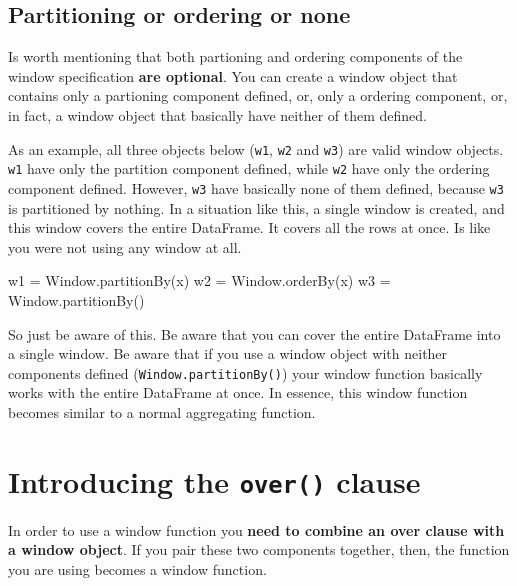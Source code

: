 \documentclass[
  11pt,
  letterpaper,
  DIV=11,
  numbers=noendperiod]{scrreprt}
\newenvironment{Shaded}{\begin{snugshade}}{\end{snugshade}}
\newcommand{\NormalTok}[1]{\textcolor[rgb]{0.00,0.23,0.31}{#1}}
\newcommand{\OperatorTok}[1]{\textcolor[rgb]{0.37,0.37,0.37}{#1}}
\newcommand{\StringTok}[1]{\textcolor[rgb]{0.13,0.47,0.30}{#1}}
\begin{document}
\hypertarget{partitioning-or-ordering-or-none}{%
\subsection{Partitioning or ordering or
none}\label{partitioning-or-ordering-or-none}}

Is worth mentioning that both partioning and ordering components of the
window specification \textbf{are optional}. You can create a window
object that contains only a partioning component defined, or, only a
ordering component, or, in fact, a window object that basically have
neither of them defined.

As an example, all three objects below (\texttt{w1}, \texttt{w2} and
\texttt{w3}) are valid window objects. \texttt{w1} have only the
partition component defined, while \texttt{w2} have only the ordering
component defined. However, \texttt{w3} have basically none of them
defined, because \texttt{w3} is partitioned by nothing. In a situation
like this, a single window is created, and this window covers the entire
DataFrame. It covers all the rows at once. Is like you were not using
any window at all.

\begin{Shaded}
\begin{Highlighting}[]
\NormalTok{w1 }\OperatorTok{=}\NormalTok{ Window.partitionBy(}\StringTok{\textquotesingle{}x\textquotesingle{}}\NormalTok{)}
\NormalTok{w2 }\OperatorTok{=}\NormalTok{ Window.orderBy(}\StringTok{\textquotesingle{}x\textquotesingle{}}\NormalTok{)}
\NormalTok{w3 }\OperatorTok{=}\NormalTok{ Window.partitionBy()}
\end{Highlighting}
\end{Shaded}

So just be aware of this. Be aware that you can cover the entire
DataFrame into a single window. Be aware that if you use a window object
with neither components defined (\texttt{Window.partitionBy()}) your
window function basically works with the entire DataFrame at once. In
essence, this window function becomes similar to a normal aggregating
function.

\hypertarget{introducing-the-over-clause}{%
\section{\texorpdfstring{Introducing the \texttt{over()}
clause}{Introducing the over() clause}}\label{introducing-the-over-clause}}

In order to use a window function you \textbf{need to combine an over
clause with a window object}. If you pair these two components together,
then, the function you are using becomes a window function.
\end{document}
